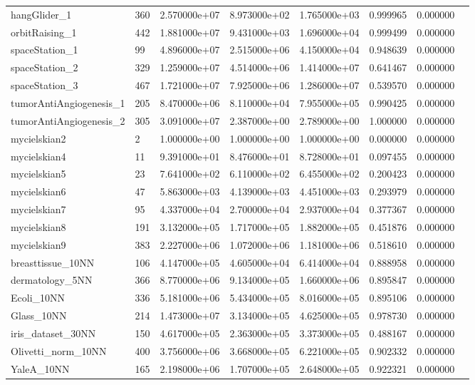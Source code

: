 \begin{tabular}{llrrrrrr}
hangGlider\_1            &  360 &  2.570000e+07 &  8.973000e+02 &  1.765000e+03 &  0.999965 &  0.000000 \\
orbitRaising\_1          &  442 &  1.881000e+07 &  9.431000e+03 &  1.696000e+04 &  0.999499 &  0.000000 \\
spaceStation\_1          &   99 &  4.896000e+07 &  2.515000e+06 &  4.150000e+04 &  0.948639 &  0.000000 \\
spaceStation\_2          &  329 &  1.259000e+07 &  4.514000e+06 &  1.414000e+07 &  0.641467 &  0.000000 \\
spaceStation\_3          &  467 &  1.721000e+07 &  7.925000e+06 &  1.286000e+07 &  0.539570 &  0.000000 \\
tumorAntiAngiogenesis\_1 &  205 &  8.470000e+06 &  8.110000e+04 &  7.955000e+05 &  0.990425 &  0.000000 \\
tumorAntiAngiogenesis\_2 &  305 &  3.091000e+07 &  2.387000e+00 &  2.789000e+00 &  1.000000 &  0.000000 \\
mycielskian2            &    2 &  1.000000e+00 &  1.000000e+00 &  1.000000e+00 &  0.000000 &  0.000000 \\
mycielskian4            &   11 &  9.391000e+01 &  8.476000e+01 &  8.728000e+01 &  0.097455 &  0.000000 \\
mycielskian5            &   23 &  7.641000e+02 &  6.110000e+02 &  6.455000e+02 &  0.200423 &  0.000000 \\
mycielskian6            &   47 &  5.863000e+03 &  4.139000e+03 &  4.451000e+03 &  0.293979 &  0.000000 \\
mycielskian7            &   95 &  4.337000e+04 &  2.700000e+04 &  2.937000e+04 &  0.377367 &  0.000000 \\
mycielskian8            &  191 &  3.132000e+05 &  1.717000e+05 &  1.882000e+05 &  0.451876 &  0.000000 \\
mycielskian9            &  383 &  2.227000e+06 &  1.072000e+06 &  1.181000e+06 &  0.518610 &  0.000000 \\
breasttissue\_10NN       &  106 &  4.147000e+05 &  4.605000e+04 &  6.414000e+04 &  0.888958 &  0.000000 \\
dermatology\_5NN         &  366 &  8.770000e+06 &  9.134000e+05 &  1.660000e+06 &  0.895847 &  0.000000 \\
Ecoli\_10NN              &  336 &  5.181000e+06 &  5.434000e+05 &  8.016000e+05 &  0.895106 &  0.000000 \\
Glass\_10NN              &  214 &  1.473000e+07 &  3.134000e+05 &  4.625000e+05 &  0.978730 &  0.000000 \\
iris\_dataset\_30NN       &  150 &  4.617000e+05 &  2.363000e+05 &  3.373000e+05 &  0.488167 &  0.000000 \\
Olivetti\_norm\_10NN      &  400 &  3.756000e+06 &  3.668000e+05 &  6.221000e+05 &  0.902332 &  0.000000 \\
YaleA\_10NN              &  165 &  2.198000e+06 &  1.707000e+05 &  2.648000e+05 &  0.922321 &  0.000000 \\
\bottomrule
\end{tabular}
